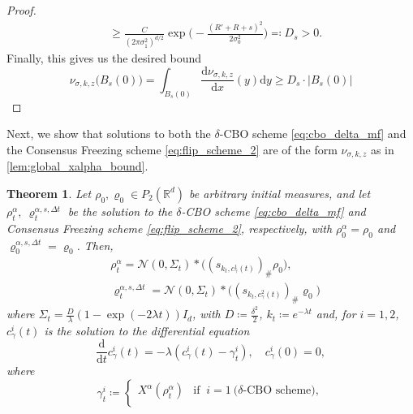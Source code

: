 \documentclass[reqno]{amsart}
\numberwithin{algorithm}{section}
\newcommand{\diff}{\mathrm{d}}
\newcommand{\RR}{\mathbb{R}}
\newcommand{\Xalpha}{{X^\alpha}}
\newcommand{\mc}[1]{\mathcal{#1}}
\newtheorem{theorem}{Theorem}[section]
\begin{document}
{\begin{proof}
\begin{equation*}
\begin{split}
            &\geq  \frac{C}{(2\pi \sigma_1^2)^{d/2}} \exp\Big(-\frac{(R' + R + s)^2}{2\sigma_0^2}\Big) \eqqcolon D_s > 0.
            \end{split}
        \end{equation*}
        Finally, this gives us the desired bound
        \begin{equation}
            \nu_{\sigma,k,z}\big(B_s(0)\big) = \int_{B_s(0)} \frac{\diff \nu_{\sigma,k,z}}{\diff x}(y) \diff y \geq D_s \cdot |B_s(0)|
        \end{equation}
    \end{proof}
    Next, we show that solutions to both the $\delta$-CBO scheme \eqref{eq:cbo_delta_mf} and the Consensus Freezing scheme \eqref{eq:flip_scheme_2} are of the form $\nu_{\sigma,k,z}$ as in \cref{lem:global_xalpha_bound}.
    \begin{theorem}\label{lem:explicit_solution}
        Let $\rho_0,\varrho_0 \in P_2(\RR^d)$ be arbitrary initial measures, and let $\rho_t^\alpha, \ \varrho^{\alpha,s,\Delta t}_t$ be the solution to the $\delta$-CBO scheme \eqref{eq:cbo_delta_mf} and Consensus Freezing scheme \eqref{eq:flip_scheme_2}, respectively, with $\rho_0^\alpha = \rho_0$ and $ \varrho^{\alpha,s,\Delta t}_0 = \varrho_0$.
        Then,
        \begin{equation*}
        \begin{aligned}
            &\rho_t^\alpha = \mc{N}(0, \Sigma_t) \ast \Big((s_{k_t,c^1_\gamma(t)})_\# \rho_0\Big),\\
            &\varrho_t^{\alpha,s,\Delta t} = \mc{N}(0, \Sigma_t) \ast \Big((s_{k_t,c^2_\gamma(t)})_\# \varrho_0\Big)
        \end{aligned}
        \end{equation*}
        where $\Sigma_t = \frac{D}{\lambda} (1 - \exp(-2 \lambda t)) I_d$, with $D \coloneqq \frac{\delta^2}{2}$, 
        $k_t \coloneqq e^{-\lambda t}$ and, for $i=1,2$,$c^i_\gamma(t)$ is the solution to the differential equation
        \begin{equation}\label{eq:differential_equation_c_gamma_t}
            \frac{\diff}{\diff t} c^i_\gamma(t) = -\lambda (c^i_\gamma(t) - \gamma_t^i), \quad c^i_\gamma(0) = 0,
        \end{equation}
        where
        \begin{equation*}
            \gamma_t^i \coloneqq \begin{cases}
                \Xalpha(\rho_t^\alpha) & \text{if }\ i=1\ 
                 \text{($\delta$-CBO scheme)}, 
                \\

\end{cases}
\end{equation*}
\end{theorem}}
\end{document}
